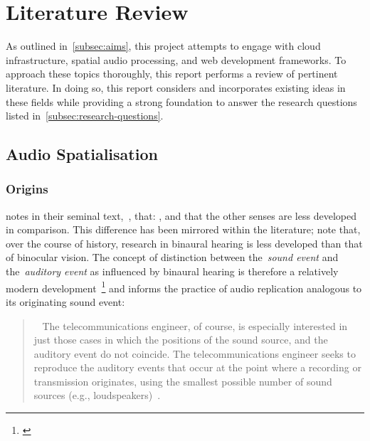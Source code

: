 
\thispagestyle{plain}
\newpage
\section{Literature Review}\label{sec:literature-review}

\normalsize

As outlined in~\ref{subsec:aims}, this project attempts to engage with cloud infrastructure, spatial audio processing, and web development frameworks.
To approach these topics thoroughly, this report performs a review of pertinent literature.
In doing so, this report considers and incorporates existing ideas in these fields while providing a strong foundation to answer the research questions listed in~\ref{subsec:research-questions}.

\subsection{Audio Spatialisation}\label{subsec:audio-spatialisation}
\subsubsection{Origins}

\citet{blauert_spatial} notes in their seminal text,~\textit{}, that: , and that the other senses are less developed in comparison.
This difference has been mirrored within the literature;
\citet{wade_binaural} note that, over the course of history, research in binaural hearing is less developed than that of binocular vision.
The concept of distinction between the~\textit{sound event} and the~\textit{auditory event} as influenced by binaural hearing is therefore a relatively modern development~\footnote{\citep{blauert_spatial}} and informs the practice of audio replication analogous to its originating sound event:

\begin{quotation}~
    The telecommunications engineer, of course, is especially interested in just those cases in which the positions of the sound source, and the auditory event do not coincide.
    The telecommunications engineer seeks to reproduce the auditory events that occur at the point where a recording or transmission originates, using the smallest possible number of sound sources (e.g., loudspeakers)~\citep{blauert_spatial}.
\end{quotation}

